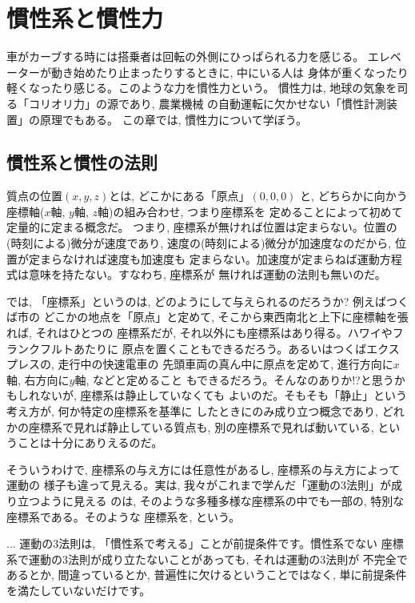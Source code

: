 \chapter{慣性系と慣性力}

車がカーブする時には搭乗者は回転の外側にひっぱられる力を感じる。
エレベーターが動き始めたり止まったりするときに, 中にいる人は
身体が重くなったり軽くなったり感じる。このような力を慣性力という。
慣性力は, 地球の気象を司る「コリオリ力」の源であり, 農業機械
の自動運転に欠かせない「慣性計測装置」の原理でもある。
この章では, 慣性力について学ぼう。


\section{慣性系と慣性の法則}
質点の位置$(x, y, z)$とは, どこかにある「原点」$(0, 0, 0)$
と, どちらかに向かう座標軸($x$軸, $y$軸, $z$軸)の組み合わせ, つまり座標系を
定めることによって初めて定量的に定まる概念だ。
つまり, 座標系が無ければ位置は定まらない。位置の(時刻による)微分が速度であり, 
速度の(時刻による)微分が加速度なのだから, 位置が定まらなければ速度も加速度も
定まらない。加速度が定まらねば運動方程式は意味を持たない。すなわち, 座標系が
無ければ運動の法則も無いのだ。

では, 「座標系」というのは, どのようにして与えられるのだろうか? 例えばつくば市の
どこかの地点を「原点」と定めて, そこから東西南北と上下に座標軸を張れば, それはひとつの
座標系だが, それ以外にも座標系はあり得る。ハワイやフランクフルトあたりに
原点を置くこともできるだろう。あるいはつくばエクスプレスの, 走行中の快速電車の
先頭車両の真ん中に原点を定めて, 進行方向に$x$軸, 右方向に$y$軸, などと定めること
もできるだろう。そんなのありか!?と思うかもしれないが, 座標系は静止していなくても
よいのだ。そもそも「静止」という考え方が, 何か特定の座標系を基準に
したときにのみ成り立つ概念であり, どれかの座標系で見れば静止している質点も, 
別の座標系で見れば動いている, ということは十分にありえるのだ。

そういうわけで, 座標系の与え方には任意性があるし, 座標系の与え方によって運動の
様子も違って見える。実は, 我々がこれまで学んだ「運動の3法則」が成り立つように見える
のは, そのような多種多様な座標系の中でも一部の, 特別な座標系である。そのような
座標系を, という。

\begin{faq}{\small{}
... 運動の3法則は, 「慣性系で考える」ことが前提条件です。慣性系でない
座標系で運動の3法則が成り立たないことがあっても, それは運動の3法則が
不完全であるとか, 間違っているとか, 普遍性に欠けるということではなく, 
単に前提条件を満たしていないだけです。}\end{faq}

